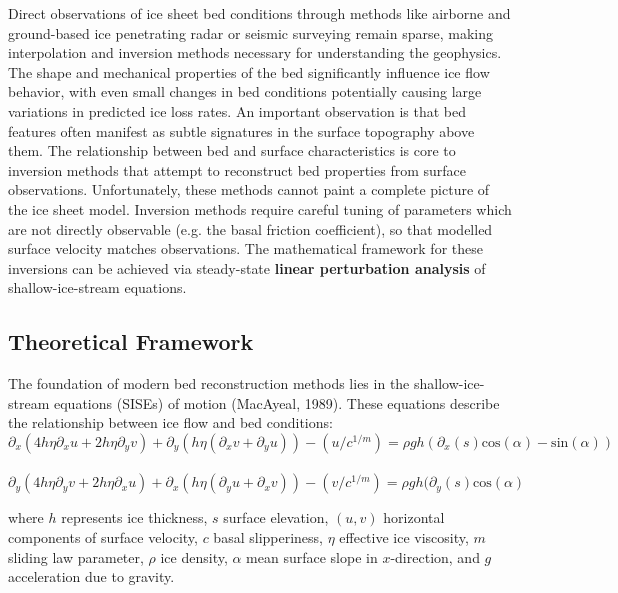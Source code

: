 Direct observations of ice sheet bed conditions through methods like airborne and ground-based ice penetrating radar or seismic surveying remain sparse, making interpolation and inversion methods necessary for understanding the geophysics. The shape and mechanical properties of the bed significantly influence ice flow behavior, with even small changes in bed conditions potentially causing large variations in predicted ice loss rates. An important observation is that bed features often manifest as subtle signatures in the surface topography above them\cite{Ockenden_2022}.
The relationship between bed and surface characteristics is core to inversion methods that attempt to reconstruct bed properties from surface observations. Unfortunately, these methods cannot paint a complete picture of the ice sheet model. Inversion methods require careful tuning of parameters which are not directly observable  (e.g. the basal friction coefficient), so that modelled surface velocity matches observations. The mathematical framework for these inversions can be achieved via steady-state \textbf{linear perturbation analysis} of shallow-ice-stream equations\cite{Gudmundsson_2008}.

\subsection*{Theoretical Framework}

The foundation of modern bed reconstruction methods lies in the shallow-ice-stream equations (SISEs) of motion (MacAyeal, 1989). These equations describe the relationship between ice flow and bed conditions:
\begin{equation}\partial_{x} (4 h \eta \partial_{x} u + 2 h \eta \partial_y v) + \partial_{y}(h \eta( \partial_{x} v + \partial_{y} u)) - (u/c^{1/m}) = \rho g h ( \partial_{x} (s) \mathrm{cos}(\alpha) - \mathrm{sin}(\alpha))
\end{equation}\\
\begin{equation}\partial_{y} (4 h \eta \partial_{y} v + 2 h \eta \partial_x u) + \partial_{x}(h \eta( \partial_{y} u + \partial_{x} v)) - (v/c^{1/m}) = \rho g h ( \partial_{y} (s) \mathrm{cos}(\alpha)
\end{equation}

where $h$ represents ice thickness, $s$ surface elevation, $(u, v)$ horizontal components of surface velocity, $c$ basal slipperiness, $\eta$ effective ice viscosity, $m$ sliding law parameter, $\rho$ ice density, $\alpha$ mean surface slope in $x$-direction, and $g$ acceleration due to gravity.

